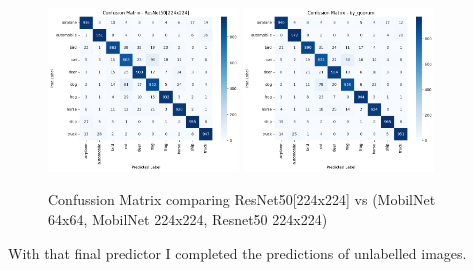 \documentclass{cpsc202}
\begin{document}
    \begin{figure}[h]
        \caption{Confussion Matrix comparing ResNet50[224x224] vs (MobilNet 64x64, MobilNet 224x224, Resnet50 224x224)}
        \centering
        \includegraphics[width=0.45\textwidth]{confusion_matrix_resnet50}
        \includegraphics[width=0.45\textwidth]{confusion_matrix_by_quorum}
        \label{fig:confussion_matrix_quorum}
    \end{figure}

    With that final predictor I completed the predictions of unlabelled images.
\end{document}
